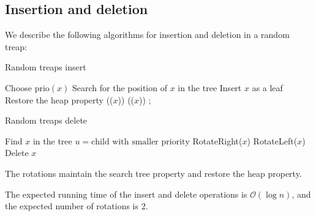\subsection{Insertion and deletion}
We describe the following algorithms for insertion and deletion in a random treap:
\begin{algorithm}[H]
    \caption{Random treaps insert}
    \begin{algorithmic}[1]
        \State Choose $\text{prio}(x)$
        \State Search for the position of $x$ in the tree
        \State Insert $x$ as a leaf
         \Comment Restore the heap property
                \State {}(($x$))
            \Else 
                \State {}(($x$))
            \EndIf
        \EndWhile;
    \end{algorithmic}
\end{algorithm}
\begin{algorithm}[H]
    \caption{Random treaps delete}
    \begin{algorithmic}[1]
        \State Find $x$ in the tree
            \State $u = \text{child with smaller priority}$
                \State RotateRight($x$)
            \Else 
                \State RotateLeft($x$)
            \EndIf
        \EndWhile
        \State Delete $x$
    \end{algorithmic}
\end{algorithm}
The rotations maintain the search tree property and restore the heap property.
\begin{lemma}
    The expected running time of the insert and delete operations is $\mathcal{O}(\log n)$, and the expected number of rotations is 2.
\end{lemma}

